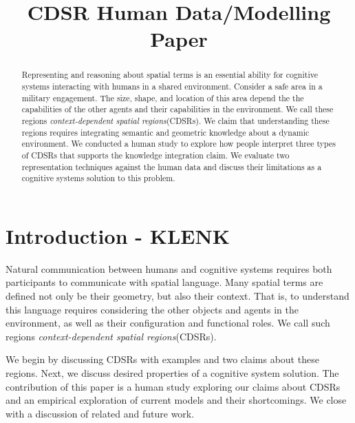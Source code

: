 \documentclass[11pt,letterpaper]{article}
\begin{document}
 

\title{CDSR Human Data/Modelling Paper}
 
\vskip 0.2in
 
\begin{abstract}
Representing and reasoning about spatial terms is an essential ability for cognitive systems interacting with humans in a shared environment.  Consider a safe area in a military engagement.  The size, shape, and location of this area depend the the capabilities of the other agents and their capabilities in the environment.  We call these regions \textit{context-dependent spatial regions}(CDSRs).  We claim that understanding these regions requires integrating semantic and geometric knowledge about a dynamic environment.  We conducted a human study to explore how people interpret three types of CDSRs that supports the knowledge integration claim.  We evaluate two representation techniques against the human data and discuss their limitations as a cognitive systems solution to this problem.
\end{abstract}

\section{Introduction - KLENK} 
Natural communication between humans and cognitive systems requires both participants to communicate with spatial language.  Many spatial terms are defined not only be their geometry, but also their context.  That is, to understand this language requires considering the other objects and agents in the environment, as well as their configuration and functional roles.  We call such regions \textit{context-dependent spatial regions}(CDSRs).

We begin by discussing CDSRs with examples and two claims about these regions.  Next, we discuss desired properties of a cognitive system solution.  The contribution of this paper is a human study exploring our claims about CDSRs and an empirical exploration of current models and their shortcomings.  We close with a discussion of related and future work. 
\end{document}
